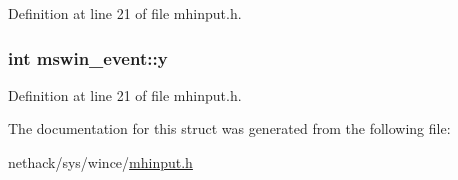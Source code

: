 Definition at line 21 of file mhinput.\+h.

\hypertarget{structmswin__event_aca428545a7d6ccd45eb16a28c5e93836}{
\subsubsection[{y}]{\setlength{\rightskip}{0pt plus 5cm}int mswin\+\_\+event\+::y}}\label{structmswin__event_aca428545a7d6ccd45eb16a28c5e93836}


Definition at line 21 of file mhinput.\+h.



The documentation for this struct was generated from the following file\+:\begin{DoxyCompactItemize}
\item 
nethack/sys/wince/\hyperlink{sys_2wince_2mhinput_8h}{mhinput.\+h}\end{DoxyCompactItemize}
